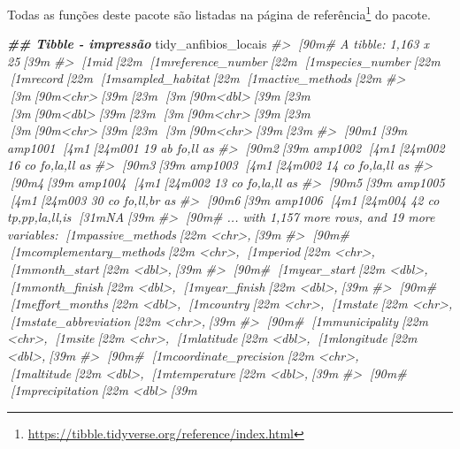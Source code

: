 \documentclass[
]{book}
\newenvironment{Shaded}{\begin{snugshade}}{\end{snugshade}}
\newcommand{\CommentTok}[1]{\textcolor[rgb]{0.37,0.37,0.37}{\textit{#1}}}
\newcommand{\DocumentationTok}[1]{\textcolor[rgb]{0.37,0.37,0.37}{\textbf{\textit{#1}}}}
\newcommand{\NormalTok}[1]{#1}
\renewcommand{\href}[2]{#2\footnote{\url{#1}}}
\begin{document}
Todas as funções deste pacote são listadas na \href{https://tibble.tidyverse.org/reference/index.html}{página de referência} do pacote.

\begin{Shaded}
\begin{Highlighting}[]
\DocumentationTok{\#\# Tibble {-} impressão}
\NormalTok{tidy\_anfibios\_locais}
\CommentTok{\#\textgreater{} [90m\# A tibble: 1,163 x 25[39m}
\CommentTok{\#\textgreater{}   [1mid[22m      [1mreference\_number[22m [1mspecies\_number[22m [1mrecord[22m [1msampled\_habitat[22m [1mactive\_methods[22m}
\CommentTok{\#\textgreater{}   [3m[90m\textless{}chr\textgreater{}[39m[23m              [3m[90m\textless{}dbl\textgreater{}[39m[23m          [3m[90m\textless{}dbl\textgreater{}[39m[23m [3m[90m\textless{}chr\textgreater{}[39m[23m  [3m[90m\textless{}chr\textgreater{}[39m[23m           [3m[90m\textless{}chr\textgreater{}[39m[23m         }
\CommentTok{\#\textgreater{} [90m1[39m amp1001             [4m1[24m001             19 ab     fo,ll           as            }
\CommentTok{\#\textgreater{} [90m2[39m amp1002             [4m1[24m002             16 co     fo,la,ll        as            }
\CommentTok{\#\textgreater{} [90m3[39m amp1003             [4m1[24m002             14 co     fo,la,ll        as            }
\CommentTok{\#\textgreater{} [90m4[39m amp1004             [4m1[24m002             13 co     fo,la,ll        as            }
\CommentTok{\#\textgreater{} [90m5[39m amp1005             [4m1[24m003             30 co     fo,ll,br        as            }
\CommentTok{\#\textgreater{} [90m6[39m amp1006             [4m1[24m004             42 co     tp,pp,la,ll,is  [31mNA[39m            }
\CommentTok{\#\textgreater{} [90m\# ... with 1,157 more rows, and 19 more variables: [1mpassive\_methods[22m \textless{}chr\textgreater{},[39m}
\CommentTok{\#\textgreater{} [90m\#   [1mcomplementary\_methods[22m \textless{}chr\textgreater{}, [1mperiod[22m \textless{}chr\textgreater{}, [1mmonth\_start[22m \textless{}dbl\textgreater{},[39m}
\CommentTok{\#\textgreater{} [90m\#   [1myear\_start[22m \textless{}dbl\textgreater{}, [1mmonth\_finish[22m \textless{}dbl\textgreater{}, [1myear\_finish[22m \textless{}dbl\textgreater{},[39m}
\CommentTok{\#\textgreater{} [90m\#   [1meffort\_months[22m \textless{}dbl\textgreater{}, [1mcountry[22m \textless{}chr\textgreater{}, [1mstate[22m \textless{}chr\textgreater{}, [1mstate\_abbreviation[22m \textless{}chr\textgreater{},[39m}
\CommentTok{\#\textgreater{} [90m\#   [1mmunicipality[22m \textless{}chr\textgreater{}, [1msite[22m \textless{}chr\textgreater{}, [1mlatitude[22m \textless{}dbl\textgreater{}, [1mlongitude[22m \textless{}dbl\textgreater{},[39m}
\CommentTok{\#\textgreater{} [90m\#   [1mcoordinate\_precision[22m \textless{}chr\textgreater{}, [1maltitude[22m \textless{}dbl\textgreater{}, [1mtemperature[22m \textless{}dbl\textgreater{},[39m}
\CommentTok{\#\textgreater{} [90m\#   [1mprecipitation[22m \textless{}dbl\textgreater{}[39m}
\end{Highlighting}
\end{Shaded}
\end{document}
